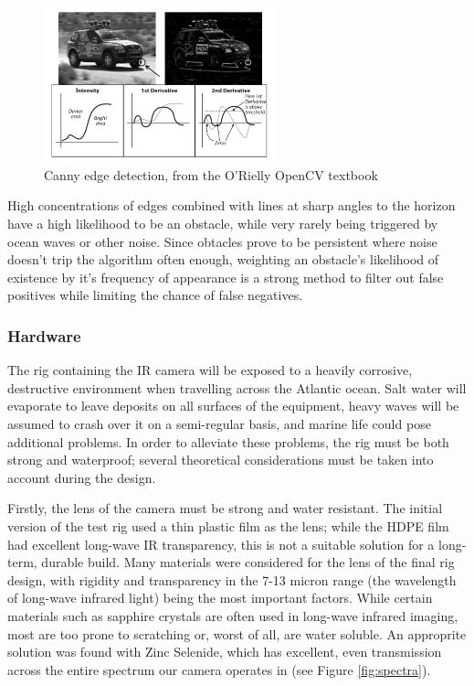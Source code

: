 \begin{figure}[h]
\centering
\includegraphics[width=0.6\textwidth]{"./image/canny"}
\caption{Canny edge detection, from the O'Rielly OpenCV textbook}
\label{fig:canny}
\end{figure}

High concentrations of edges combined with lines at sharp angles to the horizon have a high likelihood to be an obstacle, while very rarely being triggered by ocean waves or other noise. Since obtacles prove to be persistent where noise doesn't trip the algorithm often enough, weighting an obstacle's likelihood of existence by it's frequency of appearance is a strong method to filter out false positives while limiting the chance of false negatives.


\subsubsection{\label{sec:discussion:theory:righardware}Hardware}

The rig containing the IR camera will be exposed to a heavily corrosive, destructive environment when travelling across the Atlantic ocean. Salt water will evaporate to leave deposits on all surfaces of the equipment, heavy waves will be assumed to crash over it on a semi-regular basis, and marine life could pose additional problems. In order to alleviate these problems, the rig must be both strong and waterproof; several theoretical considerations must be taken into account during the design.

Firstly, the lens of the camera must be strong and water resistant. The initial version of the test rig used a thin plastic film as the lens; while the HDPE film had excellent long-wave IR transparency, this is not a suitable solution for a long-term, durable build. Many materials were considered for the lens of the final rig design, with rigidity and transparency in the 7-13 micron range (the wavelength of long-wave infrared light) being the most important factors. While certain materials such as sapphire crystals are often used in long-wave infrared imaging, most are too prone to scratching or, worst of all, are water soluble. An approprite solution was found with Zinc Selenide, which has excellent, even transmission across the entire spectrum our camera operates in (see Figure \ref{fig:spectra}).

